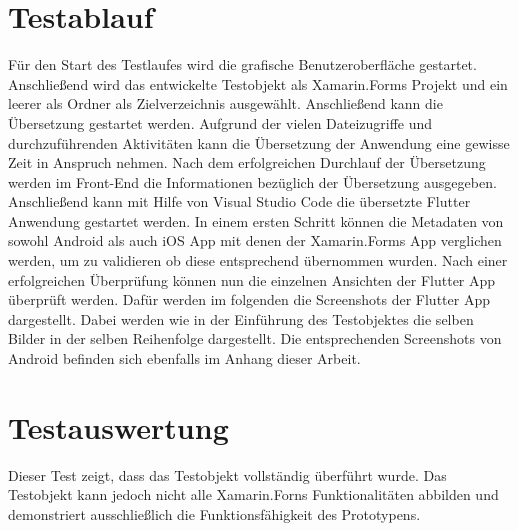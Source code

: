 \section{Testablauf}
Für den Start des Testlaufes wird die grafische Benutzeroberfläche gestartet. Anschließend wird das entwickelte Testobjekt als Xamarin.Forms Projekt und ein leerer als Ordner als Zielverzeichnis ausgewählt. Anschließend kann die Übersetzung gestartet werden.  Aufgrund der vielen Dateizugriffe und durchzuführenden Aktivitäten kann die Übersetzung der Anwendung eine gewisse Zeit in Anspruch nehmen. 
Nach dem erfolgreichen Durchlauf der Übersetzung werden im Front-End die Informationen bezüglich der Übersetzung ausgegeben.  
Anschließend kann mit Hilfe von Visual Studio Code die übersetzte Flutter Anwendung gestartet werden.  In einem ersten Schritt können die Metadaten von sowohl Android als auch iOS App mit denen der Xamarin.Forms App verglichen werden, um zu validieren ob diese entsprechend übernommen wurden.
Nach einer erfolgreichen Überprüfung können nun die einzelnen Ansichten der Flutter App überprüft werden.  Dafür werden im folgenden die Screenshots der Flutter App dargestellt.  Dabei werden wie in der Einführung des Testobjektes die selben Bilder in der selben Reihenfolge dargestellt.  Die entsprechenden Screenshots von Android befinden sich ebenfalls im Anhang dieser Arbeit. 

\section{Testauswertung}
Dieser Test zeigt,  dass das Testobjekt vollständig überführt wurde.  Das Testobjekt kann jedoch nicht alle Xamarin.Forns Funktionalitäten abbilden und demonstriert ausschließlich die Funktionsfähigkeit des Prototypens.  